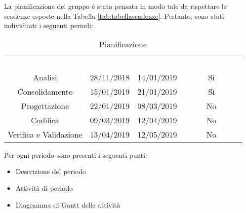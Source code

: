 La pianificazione del gruppo \gruppo \space è stata pensata in modo tale da rispettare le scadenze esposte nella Tabella \ref{tab:tabellascadenze}.\newline
Pertanto, sono stati individuati i seguenti periodi:

\renewcommand{\arraystretch}{1.5}
\begin{table}[H]	
	\begin{center}
	    \begin{tabular}{| c | c | c | c |}
	        \hline
	        \rowcolor{greySWEight}
	        \textcolor{white}{\textbf{Periodo}} & \textcolor{white}{\textbf{Inizio}}& \textcolor{white}{\textbf{Fine}}&\textcolor{white}{\textbf{In preventivo}}\\
	        Analisi & 28/11/2018 & 14/01/2019&Sì\\
	        Consolidamento & 15/01/2019 & 21/01/2019&Sì\\
	        Progettazione & 22/01/2019 & 08/03/2019&No\\
	        Codifica & 09/03/2019 & 12/04/2019&No\\
	        Verifica e Validazione & 13/04/2019 & 12/05/2019&No\\
	        \hline
	    \end{tabular}
	    \caption{Pianificazione} \label{tab:pianificazione} 
	\end{center}
\end{table}


Per ogni periodo sono presenti i seguenti punti:
\begin{itemize}
	\item Descrizione del periodo
	\item Attività di periodo
	\item Diagramma di Gantt delle attività
\end{itemize}